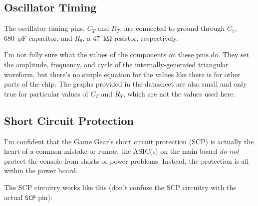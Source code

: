 \documentclass{article}
\newcommand{\chippin}{\texttt}
\begin{document}
\subsection{Oscillator Timing}
The oscillator timing pins, $C_T$ and $R_T$, are connected to ground
through $C_7$, \qty{680}{\pico\farad} capacitor, and $R_9$, a
\qty{47}{\kilo\ohm} resistor, respectively.

I'm not fully sure what the values of the components on these pins
do. They set the amplitude, frequency, and cycle of the
internally-generated triangular waveform, but there's no simple
equation for the values like there is for other parts of the chip. The
graphs provided in the datasheet are also small and only true for
particular values of $C_T$ and $R_T$, which are not the values used
here.

\subsection{Short Circuit Protection}
\label{sec:scp}
I'm confident that the Game Gear's short circuit protection (SCP) is
actually the heart of a common mistake or rumor: the ASIC(s) on the
main board \emph{do not} protect the console from shorts or power
problems. Instead, the protection is all within the power board.

The SCP circuitry works like this (don't confuse the SCP circuitry
with the actual \chippin{SCP} pin):
\end{document}
